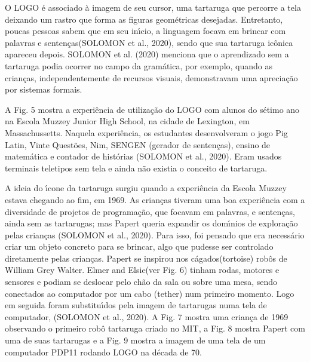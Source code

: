 \documentclass[
12pt,		%
openright,	%
twoside,  %
a4paper,			%
chapter=TITLE,		%
english,			%
french,				%
spanish,			%
brazil				%
]{USPSC-classe/USPSC}
\begin{document}
O LOGO \'e associado \`a imagem de seu cursor, uma tartaruga que percorre a tela deixando um rastro que forma as figuras geom\'etricas desejadas. Entretanto, poucas pessoas sabem que em seu in\'{\i}cio, a linguagem \textquotedbl focava em brincar com palavras e senten\c{c}as\textquotedbl  (SOLOMON et al., 2020), sendo que sua tartaruga \textquotedbl  ic\^onica \textquotedbl  apareceu depois.  SOLOMON et al. (2020) menciona que o aprendizado sem a tartaruga podia ocorrer no campo da gram\'atica, por exemplo, quando as crian\c{c}as, independentemente de recursos visuais, demonstravam uma aprecia\c{c}\~ao por sistemas formais.









A Fig. 5 mostra a experi\^encia de utiliza\c{c}\~ao do LOGO com alunos do s\'etimo ano na Escola Muzzey Junior High School, na cidade de Lexington, em Massachussetts. Naquela experi\^encia, os estudantes desenvolveram o jogo Pig Latin, Vinte Quest\~oes, Nim, SENGEN (gerador de senten\c{c}as), ensino de matem\'atica e contador de hist\'orias  (SOLOMON et al., 2020). Eram usados terminais teletipos sem tela e ainda n\~ao existia o conceito de tartaruga.









A ideia do \'{\i}cone da tartaruga surgiu quando a experi\^encia da Escola Muzzey estava chegando ao fim, em 1969. As crian\c{c}as tiveram uma boa experi\^encia com a diversidade de projetos de programa\c{c}\~ao, que focavam em palavras, e senten\c{c}as, ainda sem as tartarugas; mas Papert queria expandir os dom\'{\i}nios de explora\c{c}\~ao pelas crian\c{c}as (SOLOMON et al., 2020). Para isso, foi pensado que era necess\'ario criar um objeto concreto para se brincar, algo que pudesse ser controlado diretamente pelas crian\c{c}as. Papert se inspirou nos \textquotedbl c\'agados\textquotedbl   (tortoise) rob\^os de William Grey Walter. \textquotedbl Elmer and Elsie\textquotedbl  (ver Fig. 6) tinham rodas, motores e sensores e podiam se deslocar pelo ch\~ao da sala ou sobre uma mesa, sendo conectados ao computador por um cabo (tether) num primeiro momento. Logo em seguida foram substitu\'{\i}dos pela imagem de tartarugas numa tela de computador, (SOLOMON et al., 2020). A Fig. 7 mostra uma crian\c{c}a de 1969 observando o primeiro rob\^o tartaruga criado no MIT, a Fig. 8 mostra Papert com uma de suas tartarugas e a Fig. 9 mostra a imagem de uma tela de um computador PDP11 rodando LOGO na d\'ecada de 70.
\end{document}
